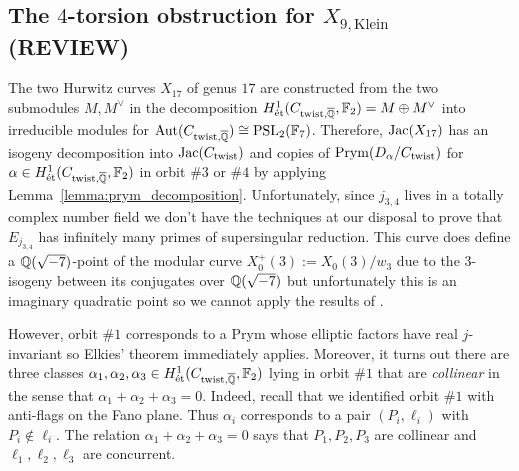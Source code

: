 \documentclass[main.tex]{subfiles}
\begin{document}
\subsection{The $4$-torsion obstruction for $X_{9, \mathrm{Klein}}$ (REVIEW)} \label{sec:Klein_supersingular_covers}


The two Hurwitz curves $X_{17}$ of genus $17$ are constructed from the two submodules $M, M^{\vee}$ in the decomposition $H^1_{\mathrm{\acute{e}t}}(C_{\mathrm{twist},\overline{\mathbb{Q}}}, \mathbb{F}_2) = M \oplus M^{\vee}$ into irreducible modules for $\operatorname{\mathrm{Aut}}(C_{\mathrm{twist},\overline{\mathbb{Q}}}) \cong \mathrm{PSL}_2(\mathbb{F}_7)$. Therefore, $\operatorname{\mathrm{Jac}}(X_{17})$ has an isogeny decomposition into $\operatorname{\mathrm{Jac}}(C_{\mathrm{twist}})$ and copies of $\operatorname{\mathrm{Prym}}(D_{\alpha}/C_{\mathrm{twist}})$ for $\alpha \in H^1_{\mathrm{\acute{e}t}}(C_{\mathrm{twist},\overline{\mathbb{Q}}}, \mathbb{F}_2)$ in orbit $\# 3$ or $\# 4$ by applying Lemma~\ref{lemma:prym_decomposition}. Unfortunately, since $j_{3,4}$ lives in a totally complex number field we don't have the techniques at our disposal to prove that $E_{j_{3,4}}$ has infinitely many primes of supersingular reduction. This curve does define a $\mathbb{Q}(\sqrt{-7})$-point of the modular curve $X^+_0(3) := X_0(3) / w_3$ due to the $3$-isogeny between its conjugates over $\mathbb{Q}(\sqrt{-7})$ but unfortunately this is an imaginary quadratic point so we cannot apply the results of \cite{jao_supersingular}.
\par 
However, orbit $\# 1$ corresponds to a Prym whose elliptic factors have real $j$-invariant so Elkies' theorem immediately applies. Moreover, it turns out there are three classes $\alpha_1, \alpha_2, \alpha_3 \in H^1_{\mathrm{\acute{e}t}}(C_{\mathrm{twist},\overline{\mathbb{Q}}}, \mathbb{F}_2)$ lying in orbit $\#1$ that are \textit{collinear} in the sense that $\alpha_1 + \alpha_2 + \alpha_3 = 0$. Indeed, recall that we identified orbit $\# 1$ with anti-flags on the Fano plane. Thus $\alpha_i$ corresponds to a pair $(P_i, \ell_i)$ with $P_i \notin \ell_i$. The relation $\alpha_1 + \alpha_2 + \alpha_3 = 0$ says that $P_1, P_2, P_3$ are collinear and $\ell_1, \ell_2, \ell_3$ are concurrent. 


\end{document}
